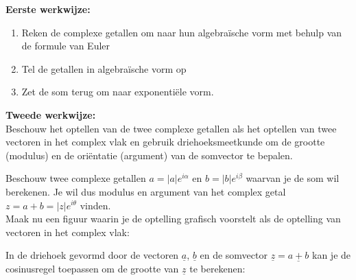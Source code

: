 {\bf Eerste werkwijze:} \\

\begin{enumerate}
	\item Reken de complexe getallen om naar hun algebra\"{i}sche vorm met behulp van de formule van Euler
	\item Tel de getallen in algebra\"{i}sche vorm op
	\item Zet de som terug om naar exponenti\"{e}le vorm.
\end{enumerate}

\vspace{0.3cm}

{\bf Tweede werkwijze:} \\

Beschouw het optellen van de twee complexe getallen als het optellen van twee vectoren in het complex vlak en gebruik driehoeksmeetkunde om de grootte (modulus) en de ori\"{e}ntatie (argument) van de somvector te bepalen.\\

\vspace{0.3cm}

Beschouw twee complexe getallen $a=|a|e^{i\alpha}$ en $b=|b|e^{i\beta}$ waarvan je de som wil berekenen. Je wil dus modulus en argument van het complex getal $z=a+b=|z|e^{i\theta}$ vinden.\\
Maak nu een figuur waarin je de optelling grafisch voorstelt als de optelling van vectoren in het complex vlak:\\



In de driehoek gevormd door de vectoren $\underline{a}$, $\underline{b}$ en de somvector $\underline{z}=\underline{a+b}$ kan je de cosinusregel toepassen om de grootte van $\underline{z}$ te berekenen:\\


